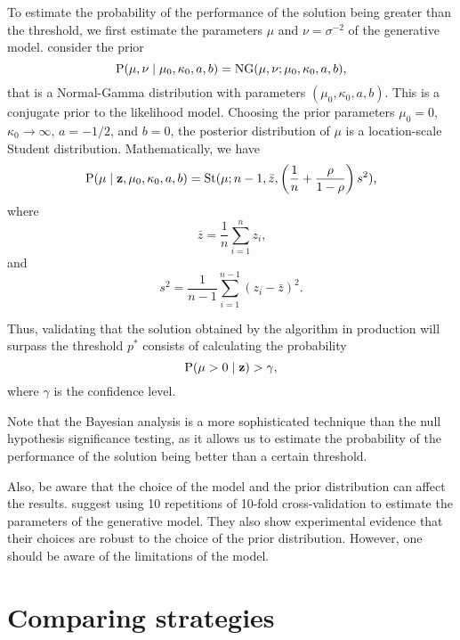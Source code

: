 To estimate the probability of the performance of the solution being greater than the
threshold, we first estimate the parameters $\mu$ and $\nu = \sigma^{-2}$ of the
generative model.  \textcite{Benavoli2017} consider the prior
\begin{equation*}
  \operatorname{P}(\mu, \nu \mid \mu_0, \kappa_0, a, b) = \operatorname{NG}(\mu, \nu; \mu_0, \kappa_0, a, b)\text{,}
\end{equation*}
that is a Normal-Gamma distribution with parameters $(\mu_0, \kappa_0, a, b)$.  This is a
conjugate prior to the likelihood model.  Choosing the prior parameters $\mu_0 = 0$,
$\kappa_0 \to \infty$, $a = -1/2$, and $b = 0$, the posterior distribution of $\mu$ is a
location-scale Student distribution.  Mathematically, we have
\begin{equation*}
  \operatorname{P}(\mu \mid \mathbf{z}, \mu_0, \kappa_0, a, b) =
    \operatorname{St}(\mu; n - 1, \bar{z}, \left(
      \frac{1}{n} + \frac{\rho}{1 - \rho}
    \right)s^2)\text{,}
\end{equation*}
where
\begin{equation*}
  \bar{z} = \frac{1}{n} \sum_{i=1}^n z_i\text{,}
\end{equation*}
and
\begin{equation*}
  s^2 = \frac{1}{n - 1} \sum_{i=1}^{n-1} (z_i - \bar{z})^2\text{.}
\end{equation*}

Thus, validating that the solution obtained by the algorithm in production will surpass
the threshold $p^{*}$ consists of calculating the probability
\begin{equation*}
  \operatorname{P}(\mu > 0 \mid \mathbf{z}) > \gamma\text{,}
\end{equation*}
where $\gamma$ is the confidence level.

Note that the Bayesian analysis is a more sophisticated technique than the null hypothesis
significance testing, as it allows us to estimate the probability of the performance of
the solution being better than a certain threshold.

Also, be aware that the choice of the model and the prior distribution can affect the
results.  \textcite{Benavoli2017} suggest using 10 repetitions of 10-fold cross-validation
to estimate the parameters of the generative model.  They also show experimental evidence
that their choices are robust to the choice of the prior distribution.  However, one
should be aware of the limitations of the model.

\section{Comparing strategies}
\label{sub:comparison}

